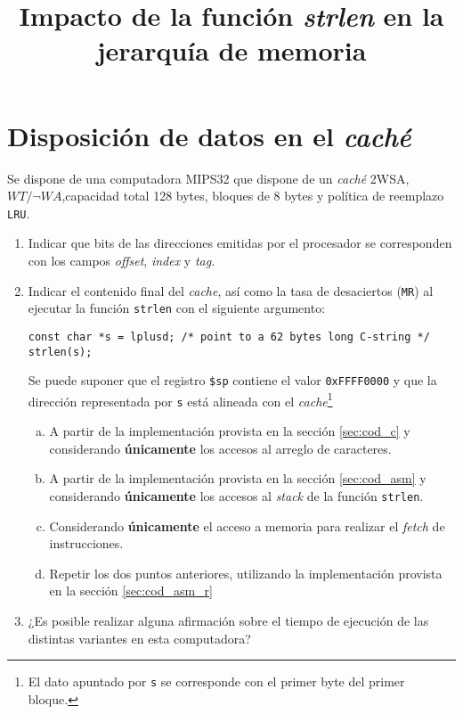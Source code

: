 \documentclass[a4paper]{article}
\title{Impacto de la función \textit{strlen} en la jerarquía de memoria}
\date{}
\begin{document}
\maketitle


\section{Disposición de datos en el \textit{caché}}
Se dispone de una computadora MIPS32 que dispone de un \textit{caché} 2WSA, \texttt{$WT/\neg WA$},capacidad total 128 bytes,
bloques de 8 bytes y política de reemplazo \texttt{LRU}.
\begin{enumerate}

\item Indicar que bits de las direcciones emitidas por el procesador se corresponden con los campos \textit{offset}, \textit{index} y \textit{tag}.

\item Indicar el contenido final del \textit{cache}, así como la tasa de desaciertos (\texttt{MR}) al ejecutar la 
función \texttt{strlen} con el siguiente argumento:

\begin{lstlisting}
const char *s = lplusd; /* point to a 62 bytes long C-string */
strlen(s);
\end{lstlisting}
 
 Se puede suponer que el registro \texttt{\$sp} contiene el valor \texttt{0xFFFF0000} y que la dirección representada por \texttt{s} está alineada con el \textit{cache}\footnote{El dato apuntado por \texttt{s} se corresponde con el primer byte del primer bloque.}
\begin{enumerate}[a.]
  
  \item A partir de la implementación provista en la sección \ref{sec:cod_c} y considerando \textbf{únicamente} 
	los accesos al arreglo de caracteres.
 
  \item A partir de la implementación provista en la sección \ref{sec:cod_asm} y considerando \textbf{únicamente} 
	los accesos al \textit{stack} de la función \texttt{strlen}.
  
  \item Considerando \textbf{únicamente} el acceso a memoria para realizar el \textit{fetch} de instrucciones.

  \item Repetir los dos puntos anteriores, utilizando la implementación provista en la sección \ref{sec:cod_asm_r}
\end{enumerate}

\item ¿Es posible realizar alguna afirmación sobre el tiempo de ejecución de las distintas variantes en esta computadora?

\end{enumerate}
\end{document}
